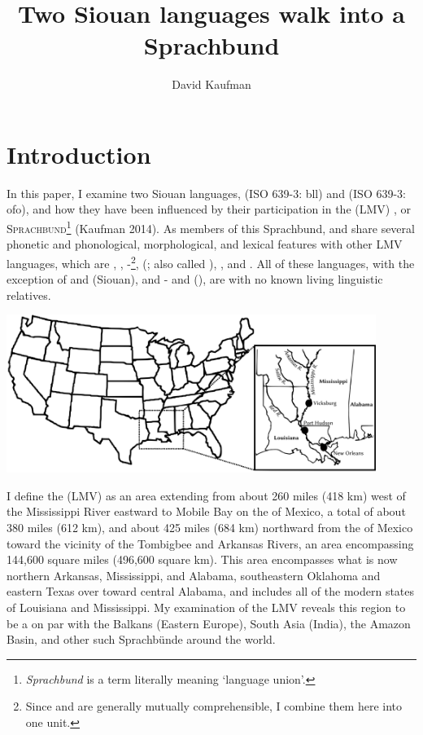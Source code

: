 \documentclass[output=paper]{LSP/langsci}
\author{David Kaufman}
\title{Two Siouan languages walk into a Sprachbund}
\begin{document}
\section{Introduction}
In this paper, I examine two Siouan languages,  (ISO 639-3: bll) and  (ISO 639-3: ofo), and how they have been influenced by their participation in the  (LMV) , or \textsc{Sprachbund}\footnote{\emph{Sprachbund} is a  term literally meaning `language union'.} (Kaufman 2014). As members of this Sprachbund,  and  share several phonetic and phonological, morphological, and lexical features with other LMV languages, which are , , -\footnote{Since  and  are generally mutually comprehensible, I combine them here into one unit.},  (; also called ), , and . All of these languages, with the exception of  and  (Siouan), and - and  (), are  with no known living linguistic relatives.

\includegraphics[width=12cm]{figures/Kaufman1}

I define the  (LMV) as an area extending from about 260 miles (418 km) west of the Mississippi River eastward to Mobile Bay on the  of Mexico, a total of about 380 miles (612 km), and about 425 miles (684 km) northward from the  of Mexico toward the vicinity of the Tombigbee and Arkansas Rivers, an area encompassing 144,600 square miles (496,600 square km). This area encompasses what is now northern Arkansas, Mississippi, and Alabama, southeastern Oklahoma and eastern Texas over toward central Alabama, and includes all of the modern states of Louisiana and Mississippi. My examination of the LMV reveals this region to be a  on par with the Balkans (Eastern Europe), South Asia (India), the Amazon Basin, and other such Sprachbünde around the world.
\end{document}
